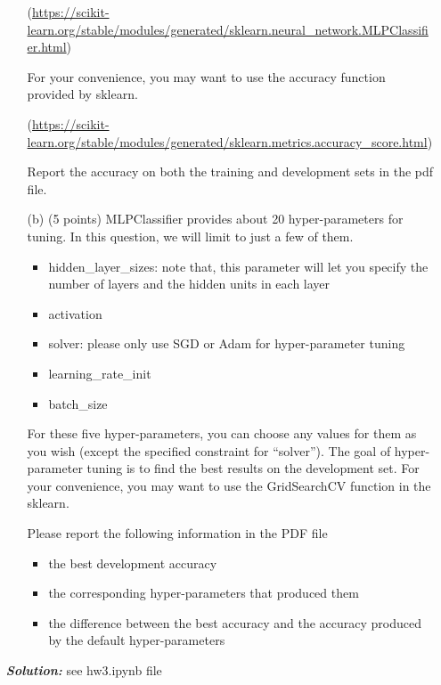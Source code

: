 \documentclass[10pt]{article}
\begin{document}
\begin{enumerate}
\begin{itemize}
  (\small \url{https://scikit-learn.org/stable/modules/generated/sklearn.neural_network.MLPClassifier.html}) 
  
  For your convenience, you may want to use the {accuracy function}  provided by sklearn.
  
  (\small \url{https://scikit-learn.org/stable/modules/generated/sklearn.metrics.accuracy_score.html})
  
 

    Report the accuracy on both the training and development sets in the pdf file.
  \item[(b)] (5 points) MLPClassifier provides about 20 hyper-parameters for tuning. In this question, we will limit to just a few of them.
    \begin{itemize}
    \item hidden\_layer\_sizes: note that, this parameter will let you specify the number of layers and the hidden units in each layer
    \item activation
    \item solver: please only use SGD or Adam for hyper-parameter tuning
    \item learning\_rate\_init
    \item batch\_size
    \end{itemize}
    For these five hyper-parameters, you can choose any values for them as you wish (except the specified constraint for ``solver'').
    The goal of hyper-parameter tuning is to find the best results on the development set.
    For your convenience, you may want to use the GridSearchCV function in the sklearn.

    Please report the following information in the PDF file
    \begin{itemize}
    \item the best development accuracy
    \item the corresponding hyper-parameters that produced them
    \item the difference between the best accuracy and the accuracy produced by the default hyper-parameters
    \end{itemize}
  \end{itemize}
 \hspace{\parindent}\textit{\textbf{Solution:}}
see hw3.ipynb file
\end{enumerate}

\end{document}
